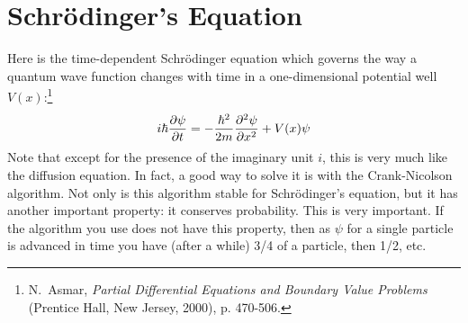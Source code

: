  \chapter{Schr\"{o}dinger's Equation}
 \label{Lab:9}


Here is the time-dependent Schr\"{o}dinger equation which governs the
way a quantum wave function changes with time in a one-dimensional
potential well $V(x)$:\footnote{N.\ Asmar, {\it Partial Differential
Equations and Boundary Value Problems} (Prentice Hall, New Jersey,
2000), p. 470-506.}
\begin{equation}
    i \hbar {\partial \psi \over \partial t} = -{\hbar^2 \over 2 m}
    {\partial^2 \psi \over \partial x^2} + V(x) \psi
\end{equation}
Note that except for the presence of the imaginary unit $i$, this is
very much like the diffusion equation. In fact, a good way to solve
it is with the Crank-Nicolson algorithm. Not only is this algorithm
stable for Schr\"{o}dinger's equation, but it has another important
property: it conserves probability. This is very important. If the
algorithm you use does not have this property, then as $\psi$ for a
single particle is advanced in time you have (after a while) 3/4 of a
particle, then 1/2, etc.




